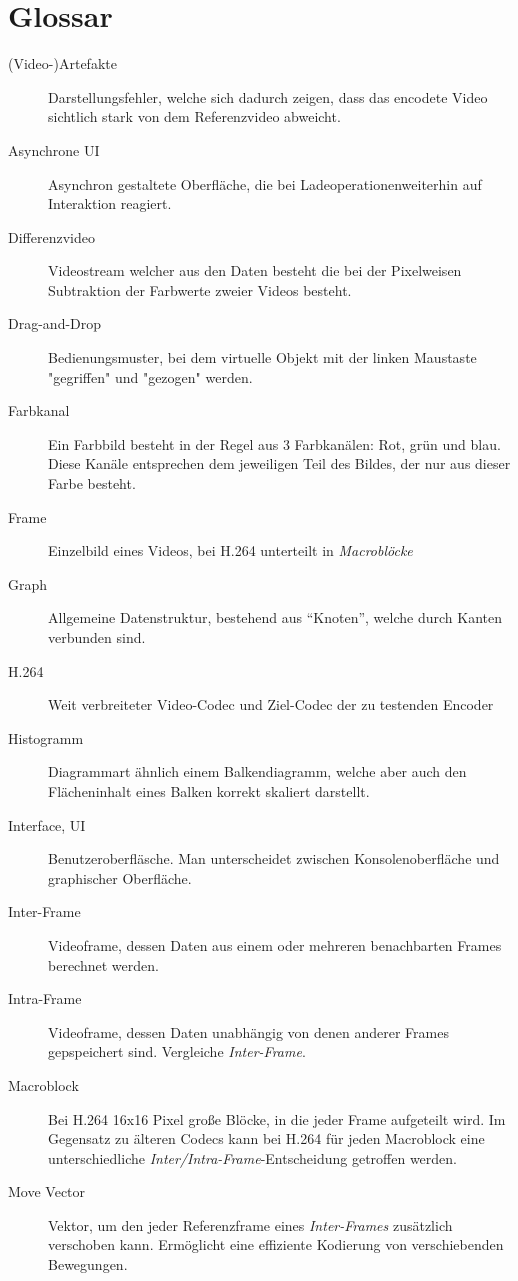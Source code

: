 \section{Glossar}

\begin{description}
    \item[(Video-)Artefakte] Darstellungsfehler, welche sich dadurch zeigen, dass das encodete Video sichtlich stark von dem Referenzvideo abweicht.
    \item[Asynchrone UI] Asynchron gestaltete Oberfläche, die bei Ladeoperationenweiterhin auf Interaktion reagiert.
    \item[Differenzvideo] Videostream welcher aus den Daten besteht die bei der Pixelweisen Subtraktion der Farbwerte zweier Videos besteht.
    \item[Drag-and-Drop] Bedienungsmuster, bei dem virtuelle Objekt mit der linken Maustaste "gegriffen" und "gezogen" werden.
    \item[Farbkanal] Ein Farbbild besteht in der Regel aus 3 Farbkanälen: Rot, grün und blau. Diese Kanäle entsprechen dem jeweiligen Teil des Bildes, der nur aus dieser Farbe besteht.
    \item[Frame] Einzelbild eines Videos, bei H.264 unterteilt in \emph{Macroblöcke}
    \item[Graph] Allgemeine Datenstruktur, bestehend aus ``Knoten'', welche durch Kanten verbunden sind.
    \item[H.264] Weit verbreiteter Video-Codec und Ziel-Codec der zu testenden Encoder
    \item[Histogramm] Diagrammart ähnlich einem Balkendiagramm, welche aber auch den Flächeninhalt eines Balken korrekt skaliert darstellt.
    \item[Interface, UI] Benutzeroberfläsche. Man unterscheidet zwischen Konsolenoberfläche und graphischer Oberfläche.
    \item[Inter-Frame] Videoframe, dessen Daten aus einem oder mehreren benachbarten Frames berechnet werden.
    \item[Intra-Frame] Videoframe, dessen Daten unabhängig von denen anderer Frames gepspeichert sind. Vergleiche \emph{Inter-Frame}.
    \item[Macroblock] Bei H.264 16x16 Pixel große Blöcke, in die jeder Frame aufgeteilt wird. Im Gegensatz zu älteren Codecs kann bei H.264 für jeden Macroblock eine unterschiedliche \emph{Inter/Intra-Frame}-Entscheidung getroffen werden. 
    \item[Move Vector] Vektor, um den jeder Referenzframe eines \emph{Inter-Frames} zusätzlich verschoben kann. Ermöglicht eine effiziente Kodierung von verschiebenden Bewegungen.

\end{description}
